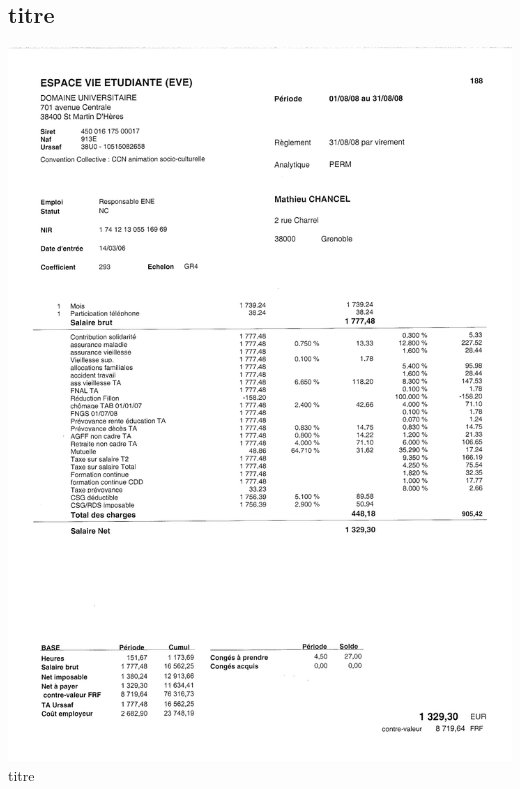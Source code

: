 \subsection{titre}
\begin{center}
\includegraphics[scale=0.6]{annexes/images/fiche_paye_mat.pdf} \\
titre
\end{center}
